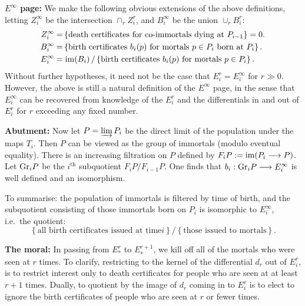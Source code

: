 \documentclass[11pt]{article}
\begin{document}
\Bullet \textbf{$E^\infty$ page:} We make the following obvious extensions of
the above definitions, letting $Z^\infty_i$ be the intersection $\cap_rZ^r_i$,
and $B^\infty_i$ be the union $\cup_rB^r_i$:
\begin{alignat*}{2}
Z_{i}^\infty
=&\left\{\text{death certificates for co-immortals dying at
$P_{i-1}$}\right\}=0.\\
B_{i}^\infty=&\left\{\text{birth certificates $b_i(p)$ for mortals $p\in
 P_i$ born at $P_i$}\right\}.\\
E_{i}^{\infty}=&\left.\operatorname{im}(B_i)\,/\left\{\text{birth certificates $b_i(p)$ for
 mortals $p\in P_i$}\right\}.\right.
\end{alignat*}
Without further hypotheses, it need not be the case that $E_i^r= E_i^\infty$ for
$r\gg0$. However, the above is still a natural definition of the $E^\infty$
page, in the sense that $E^\infty_i$ can be recovered from knowledge of the
$E^r_i$ and the differentials in and out of $E^r_i$ for $r$ exceeding any fixed
number.

\Bullet \textbf{Abutment:} Now let $P=\varinjlim P_i$ be the direct limit of the
population under the maps $T_i$. Then $P$ can be viewed as the group of
immortals (modulo eventual equality). There is an increasing filtration on $P$
defined by $F_{i}P:=\operatorname{im}(P_i\longrightarrow P)$. Let $\textup{Gr}_{i}P$ be the $i^\text{th}$
subquotient $F_{i}P/F_{i-1}P$. One finds that $b_i:\textup{Gr}_iP\longrightarrow E^\infty_i$ is well
defined and an isomorphism.

To summarise: the population of immortals is filtered by time of birth, and the
subquotient consisting of those immortals born on $P_i$ is isomorphic to
$E_i^\infty$, i.e.\ the quotient:
\[\left\{\text{all birth certificates issued at time
$i$}\right\}/\left\{\text{those issued to mortals}\right\}.\]

\Bullet \textbf{The moral:} In passing from $E_*^{r}$ to $E_*^{r+1}$, we kill
off all of the mortals who were seen at $r$ times. To clarify, restricting to
the kernel of the differential $d_r$ out of $E^r_i$, is to restrict interest
only to death certificates for people who are seen at at least $r+1$ times.
Dually, to quotient by the image of $d_r$ coming in to $E^r_i$ is to elect to
ignore the birth certificates of people who are seen at $r$ or fewer times.
\end{document}
